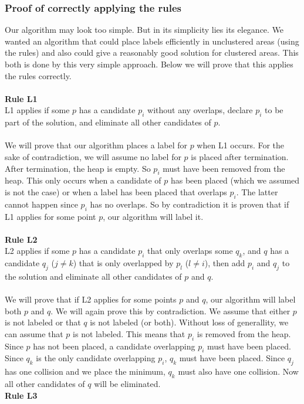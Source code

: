 \documentclass[crop=false,a4paper,oneside,11pt]{article}
\begin{document}
\subsubsection{Proof of correctly applying the rules}
Our algorithm may look too simple. But in its simplicity lies its elegance. We wanted an algorithm that could place labels efficiently in unclustered areas (using the rules) and also could give a reasonably good solution for clustered areas. This both is done by this very simple approach. Below we will prove that this applies the rules correctly.\\
\\
\textbf{Rule L1}\\
L1 applies if some $p$ has a candidate $p_i$ without any overlaps, declare $p_i$ to be part of the
solution, and eliminate all other candidates of $p$.\\
\\
We will prove that our algorithm places a label for $p$ when L1 occurs. For the sake of contradiction, we will assume no label for $p$ is placed after termination. After termination, the heap is empty. So $p_i$ must have been removed from the heap. This only occurs when a candidate of $p$ has been placed (which we assumed is not the case) or when a label has been placed that overlaps $p_i$. The latter cannot happen since $p_i$ has no overlaps. So by contradiction it is proven that if L1 applies for some point $p$, our algorithm will label it.\\
\\
\textbf{Rule L2}\\
L2 applies if some $p$ has a candidate $p_i$ that only overlaps some $q_k$, and $q$ has a
candidate $q_j$ ($j \neq k$) that is only overlapped by $p_l$ ($l \neq i$), then add $p_i$
and $q_j$ to the solution and eliminate all other candidates of $p$ and $q$.\\
\\
We will prove that if L2 applies for some points $p$ and $q$, our algorithm will label both $p$ and $q$. We will again prove this by contradiction. We assume that either $p$ is not labeled or that $q$ is not labeled (or both). Without loss of generallity, we can assume that $p$ is not labeled. This means that $p_i$ is removed from the heap. Since $p$ has not been placed, a candidate overlapping $p_i$ must have been placed. Since $q_k$ is the only candidate overlapping $p_i$, $q_k$ must have been placed. Since $q_j$ has one collision and we place the minimum, $q_k$ must also have one collision. Now all other candidates of $q$ will be eliminated. 
\\
\textbf{Rule L3}\\
\end{document}
